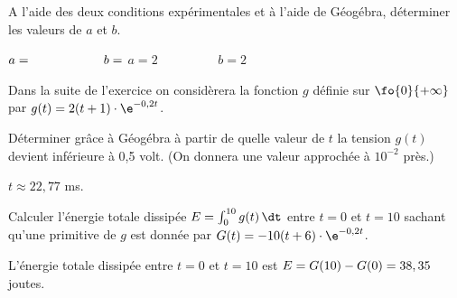 \bigskip

\begin{enumerate}[series=monDS, resume]
    \begin{minipage}{0.48\textwidth}
    \item A l'aide des deux conditions expérimentales et à l'aide de Géogébra, déterminer les valeurs de $a$ et $b$.
\end{minipage}\hfill{}
\begin{minipage}{0.45\textwidth}
    \begin{blocvisiblex}[height=1.2]
    {$a=\dotfill \hspace{2cm} b=\dotfill$}
    $a=2 \hspace{2cm} b=2$
    \end{blocvisiblex}
\end{minipage}
    \appelprof{}
\end{enumerate}

\bigskip

Dans la suite de l'exercice on considèrera la fonction $g$ définie sur $\fo{0}{+\infty}$ par $g(t)=2(t+1)\cdot \e^{-0,2t}$.


\medskip


\begin{enumerate}[series=monDS, resume]
     
    \begin{minipage}{0.75\linewidth}
           \item Déterminer grâce à Géogébra à partir de quelle valeur de $t$ la tension $g(t)$ devient inférieure à 0,5 volt. (On donnera une valeur approchée à $10^{-2}$ près.)

    \end{minipage}\hfill{}
    \begin{minipage}{0.21\linewidth}
    \begin{blocvisiblex}[height=1]
    {\quad}
    $t\approx 22,77$ ms.
    \end{blocvisiblex}
\end{minipage}

    \item Calculer l'énergie totale dissipée $E=\int_0^{10} g(t) \, \dt$ entre $t=0$ et $t=10$ sachant qu'une primitive de $g$ est donnée par $G(t)=-10(t+6)\cdot \e^{-0,2t}$.
    \begin{blocvisiblex}[height=1.2]
    {\quad}
    L'énergie totale dissipée entre $t=0$ et $t=10$ est $E=G(10)-G(0)=\dotfill 38,35$ joutes.
    \end{blocvisiblex}
\end{enumerate}
    

